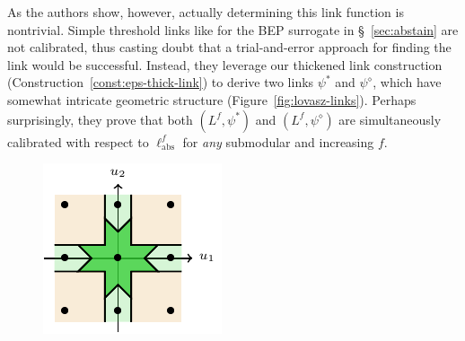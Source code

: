 \documentclass[11pt]{article}
\newcommand{\ellabs}{\ell_{\text{abs}}^f}
\begin{document}
As the authors show, however, actually determining this link function is nontrivial.
Simple threshold links like for the BEP surrogate in \S~\ref{sec:abstain} are not calibrated, thus casting doubt that a trial-and-error approach for finding the link would be successful.
Instead, they leverage our thickened link construction (Construction~\ref{const:eps-thick-link}) to derive two links $\psi^*$ and $\psi^\diamond$, which have somewhat intricate geometric structure (Figure~\ref{fig:lovasz-links}).
Perhaps surprisingly, they prove that both $(L^f, \psi^*)$ and $(L^f, \psi^\diamond)$ are simultaneously calibrated with respect to $\ellabs$ for \emph{any} submodular and increasing $f$.

\begin{figure}
	\begin{center}
		\begin{minipage}{0.48\linewidth}
			\includegraphics[width=\linewidth]{tikz/lovasz-link-psi-star.pdf}
		\end{minipage}\hfill
		\begin{minipage}{0.48\linewidth}

\end{minipage}
\end{center}
\end{figure}
\end{document}
